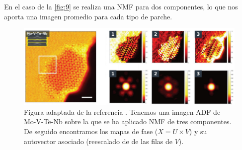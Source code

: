 En el caso de la \autoref{fig:9} se realiza una NMF para dos componentes, lo que nos aporta una imagen promedio para cada tipo de parche.

\begin{figure}[h!]
    \centering
    \includegraphics[width=1\textwidth]{fig/Fig11.png}
    \caption{Figura adaptada de la referencia \cite{ml}. Tenemos una imagen ADF de Mo-V-Te-Nb sobre la que se ha aplicado NMF de tres componentes. De seguido encontramos los mapas de fase ($X = U \times V$) y su autovector asociado (reescalado de de las filas de $V$).}
    \label{fig:11}
\end{figure}
